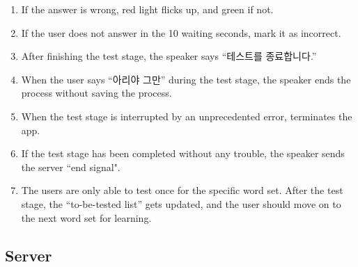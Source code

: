 \documentclass[conference]{IEEEtran}
\begin{document}
\begin{enumerate}
\begin{enumerate}
        \item If the answer is wrong, red light flicks up, and green if not.
        \item If the user does not answer in the 10 waiting seconds, mark it as incorrect.
        \item After finishing the test stage, the speaker says “테스트를 종료합니다.”
        \item When the user says “아리야 그만” during the test stage, the speaker ends the process without saving the process.
        \item When the test stage is interrupted by an unprecedented error, terminates the app.
        \item If the test stage has been completed without any trouble, the speaker sends the server “end signal".
        \item The users are only able to test once for the specific word set. After the test stage, the “to-be-tested list” gets updated, and the user should move on to the next word set for learning.
    \end{enumerate}
\end{enumerate}


\subsection{Server}
\end{document}
